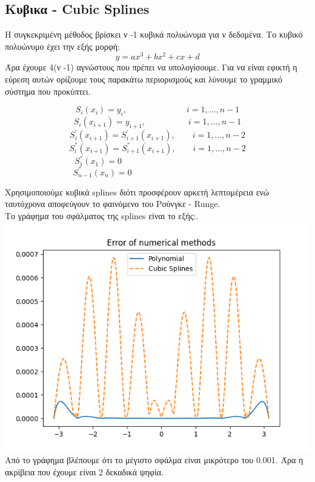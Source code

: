 \documentclass[a4paper,11pt]{article}
\newcommand{\gt}{\greektext}
\newcommand{\lt}{\latintext}
\begin{document}
\subsection{Κυβικα - \lt Cubic Splines}
Η συγκεκριμένη μέθοδος βρίσκει ν -1 κυβικά πολυώνυμα για ν δεδομένα. Το κυβικό πολυώνυμο έχει την εξής μορφή:
\begin{equation*}
y = ax^3 + bx^2 + cx + d
\end{equation*}
Άρα έχουμε 4(ν -1) αγνώστους που πρέπει να υπολογίσουμε. Για να είναι εφικτή η εύρεση αυτών ορίζουμε τους παρακάτω περιορισμούς και λύνουμε το γραμμικό σύστημα που προκύπτει.

\begin{equation*}
S_i(x_i)=y_i, 
\quad \quad \quad \quad \quad \quad  \quad
i=1,…,n-1
\end{equation*}
\begin{equation*}
S_i(x_{i+1})=y_{i+1},
\quad \quad  \quad \quad \quad i=1,…,n-1
\end{equation*}
\begin{equation*}
S^{'}_i(x_{i+1})=S^{'}_{i+1}(x_{i+1}), 
\quad \quad i=1,…,n-2
\end{equation*}
\begin{equation*}
S^{''}_i(x_{i+1})=S^{''}_{i+1}(x_{i+1}),
\quad \quad i=1,…,n-2
\end{equation*}
\begin{equation*}
S^{''}_1(x_1)=0 \quad \quad \quad \quad \quad \quad \quad \quad \quad \quad \quad \quad \quad \quad
\end{equation*}
\begin{equation*}
S^{''}_{n-1}(x_n)=0 \quad \quad \quad \quad \quad \quad \quad \quad \quad \quad \quad \quad \quad 
\end{equation*}

Χρησιμοποιούμε κυβικά \lt splines \gt διότι προσφέρουν αρκετή λεπτομέρεια ενώ ταυτόχρονα αποφεύγουν το φαινόμενο του Ρούνγκε \lt - Runge. \gt \\
Το γράφημα του σφάλματος της \lt splines \gt είναι το εξής:. \\

\hspace*{-2.7 cm}
\includegraphics[scale=1]{splines.png}
Από το γράφημα βλέπουμε ότι το μέγιστο σφάλμα είναι μικρότερο του 0.001. Άρα η ακρίβεια που έχουμε είναι 2 δεκαδικά ψηφία.
\end{document}
